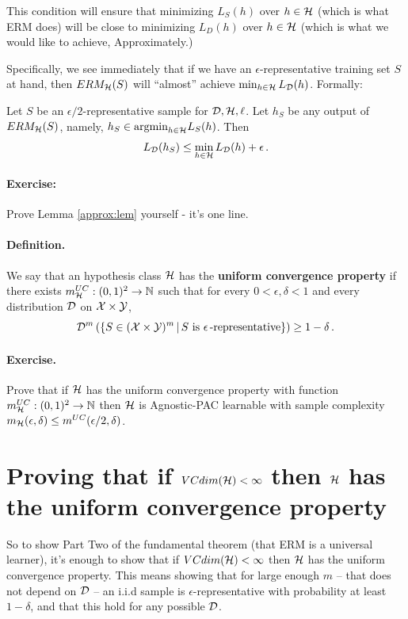 This condition will ensure that minimizing $L_S(h)$ over $h\in\mathcal{H}$
(which is what ERM does) will be close to minimizing $L_D(h)$ over $h\in\mathcal{H}$
(which is what we would like to achieve, Approximately.)

\noindent Specifically, we see immediately that if we have an $\epsilon$-representative training set
$S$ at hand, then $ERM_{\mathcal{H}}(S)$ will ``almost'' achieve $\min_{h\in\mathcal{H}}L_{\mathcal{D}}(h)$.
Formally:

\begin{lemma}
    \label{approx:lem}
    Let $S$ be an $\epsilon/2$-representative sample for $\mathcal{D},\mathcal{H},\ell$. 
    Let $h_S$ be any output of $ERM_{\mathcal{H}}(S)$, namely,
    $h_S\in\text{argmin}_{h\in\mathcal{H}}L_S(h)$. Then 
    \[
        L_{\mathcal{D}}(h_S) \leq \min_{h\in\mathcal{H}}L_{\mathcal{D}}(h) + \epsilon \,.
    \]
\end{lemma}

\paragraph{Exercise:} Prove Lemma \ref{approx:lem} yourself - it's one
line.
%
\paragraph{Definition.} We say that an hypothesis class $\mathcal{H}$ has the 
{\bf uniform convergence property} if there exists
$m^{UC}_{\mathcal{H}}:(0,1)^2\to\mathbb{N}$ such that for every $0<\epsilon,\delta<1$ and
every distribution $\mathcal{D}$ on $\mathcal{X}\times \mathcal{Y}$, 
\[
  \mathcal{D}^m\left( \left\{ S\in(\mathcal{X}\times\mathcal{Y})^m\,|\,
  S\,\,\text{is}\,\, \epsilon\,\text{-representative}\right\} \right)\geq
  1-\delta\,.
\]

\paragraph{Exercise.}
Prove that if $\mathcal{H}$ has the uniform convergence property with function 
$m^{UC}_{\mathcal{H}}:(0,1)^2\to\mathbb{N}$  then $\mathcal{H}$ is Agnostic-PAC learnable with
sample complexity 
$m_{\mathcal{H}}(\epsilon,\delta) \leq m^{UC}(\epsilon/2,\delta)$.

\section{Proving that if $VCdim(\mathcal{H})<\infty$ then $\mathcal{H}$ has the uniform
convergence property}

So to show Part Two of the fundamental theorem (that ERM is a universal
learner), it's enough to show that  if $VCdim(\mathcal{H})<\infty$ then $\mathcal{H}$ has the uniform
convergence property.
This means showing that for large enough $m$ -- that does not
depend on $\mathcal{D}$ -- an i.i.d sample is
$\epsilon$-representative with probability at least $1-\delta$, and that this
hold for  any possible $\mathcal{D}$. 






